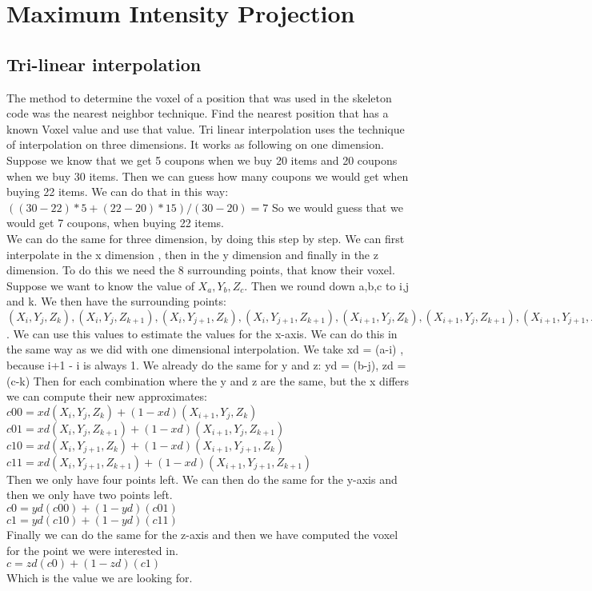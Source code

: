 \section{Maximum Intensity Projection}\label{Sec:Mip}
\subsection{Tri-linear interpolation}
The method to determine the voxel of a position that was used in the skeleton code was the nearest neighbor technique. 
Find the nearest position that has a known Voxel value and use that value. 
Tri linear interpolation uses the technique of interpolation on three dimensions.
 It works as following on one dimension. 
Suppose we know that we get 5 coupons when we buy 20 items and 20 coupons when we buy 30 items. 
Then we can guess how many coupons we would get when buying 22 items. 
We can do that in this way: $((30-22)*5 + (22-20)*15)/(30-20) = 7$ 
So we would guess that we would get 7 coupons, when buying 22 items. \\
We can do the same for three dimension, by doing this step by step. 
We can first interpolate in the x dimension , then in the y dimension and finally in the z dimension.
To do this we need the 8 surrounding points, that know their voxel. 
Suppose we want to know the value of $X_{a},Y_{b},Z_{c}$. 
Then we round down a,b,c to i,j and k. 
We then have the surrounding points: $(X_{i},Y_{j},Z_{k}),(X_{i},Y_{j},Z_{k+1}),(X_{i},Y_{j+1},Z_{k}),(X_{i},Y_{j+1},Z_{k+1}),(X_{i+1},Y_{j},Z_{k}),(X_{i+1},Y_{j},Z_{k+1}),(X_{i+1},Y_{j+1},Z_{k}) ,(X_{i+1},Y_{j+1},Z_{k+1})$. 
We can use this values to estimate the values for the x-axis. 
We can do this in the same way as we did with one dimensional interpolation. 
We take xd = (a-i) , because i+1 - i is always 1.
We already do the same for y and z: yd = (b-j), zd = (c-k) 
Then for each combination where the y and z are the same, but the x differs we can compute their new approximates: \\
$c00 = xd(X_{i},Y_{j},Z_{k})+(1-xd)(X_{i+1},Y_{j},Z_{k})$ \\
$c01 = xd(X_{i},Y_{j},Z_{k+1})+(1-xd)(X_{i+1},Y_{j},Z_{k+1})$ \\
$c10 = xd(X_{i},Y_{j+1},Z_{k})+(1-xd)(X_{i+1},Y_{j+1},Z_{k})$ \\
$c11 = xd(X_{i},Y_{j+1},Z_{k+1})+(1-xd)(X_{i+1},Y_{j+1},Z_{k+1})$ \\
Then we only have four points left. We can then do the same for the y-axis and then we only have two points left. \\
$c0= yd(c00)+(1-yd)(c01)$\\
$c1= yd(c10)+(1-yd)(c11)$\\
Finally we can do the same for the z-axis and then we have computed the voxel for the point we were interested in.\\
$c= zd(c0)+(1-zd)(c1)$\\
Which is the value we are looking for. 
